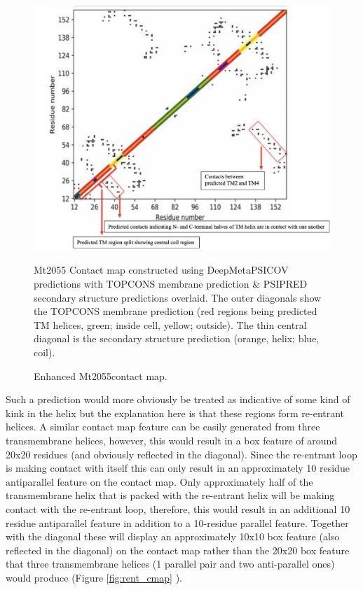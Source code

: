 \begin{figure}[th!]
    \centering
    \includegraphics[width=\textwidth]{Results/enhanced_c_map_fig.png}
    \caption{Enhanced Mt2055contact map.}
    \label{fig:w9_enhan_cmap}
    \small
    Mt2055 Contact map constructed using DeepMetaPSICOV predictions with TOPCONS  membrane prediction & PSIPRED  secondary structure predictions overlaid. The outer diagonals show the TOPCONS membrane prediction (red regions being predicted TM helices, green; inside cell, yellow; outside). The thin central diagonal is the secondary structure prediction (orange, helix; blue, coil).
\end{figure}

Such a prediction would more obviously be treated as indicative of some kind of kink in the helix \cite{Law2016} but the explanation here is that these regions form re-entrant helices. A similar contact map feature can be easily generated from three transmembrane helices, however, this would result in a box feature of around 20x20 residues (and obviously reflected in the diagonal).  Since the re-entrant loop is making contact with itself this can only result in an approximately 10 residue antiparallel feature on the contact map.  Only approximately half of the transmembrane helix that is packed with the re-entrant helix will be making contact with the re-entrant loop, therefore, this would result in an additional 10 residue antiparallel feature in addition to a 10-residue parallel feature.  Together with the diagonal these will display an approximately 10x10 box feature (also reflected in the diagonal) on the contact map rather than the 20x20 box feature that three transmembrane helices (1 parallel pair and two anti-parallel ones) would produce (Figure \ref{fig:rent_cmap} ).  


